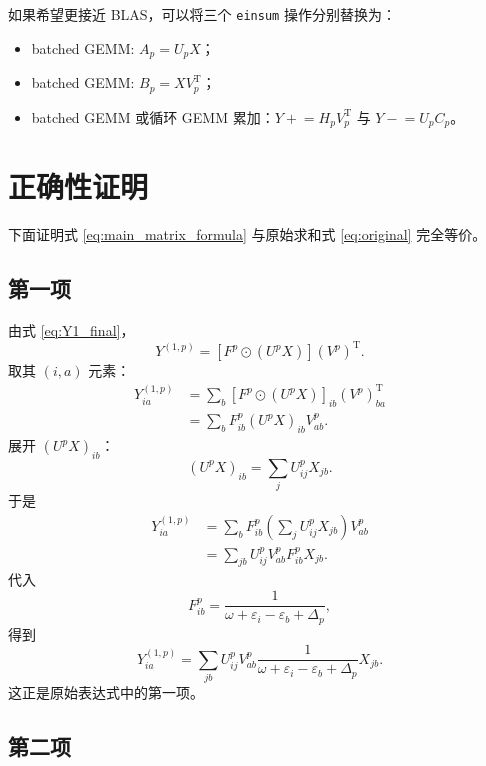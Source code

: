\documentclass[UTF8,a4paper,11pt]{ctexart}
\newcommand{\eps}{\varepsilon}
\newcommand{\Had}{\odot}
\newcommand{\trans}{\mathrm{T}}
\begin{document}
如果希望更接近 BLAS，可以将三个 \texttt{einsum} 操作分别替换为：
\begin{itemize}
  \item batched GEMM: $A_p=U_pX$；
  \item batched GEMM: $B_p=XV_p^{\trans}$；
  \item batched GEMM 或循环 GEMM 累加：$Y\mathrel{+}=H_pV_p^{\trans}$ 与 $Y\mathrel{-}=U_pC_p$。
\end{itemize}

\section{正确性证明}

下面证明式 \eqref{eq:main_matrix_formula} 与原始求和式 \eqref{eq:original} 完全等价。

\subsection{第一项}

由式 \eqref{eq:Y1_final}，
\begin{equation}
Y^{(1,p)}
=
\left[
F^p\Had (U^pX)
\right]
(V^p)^{\trans}.
\end{equation}
取其 $(i,a)$ 元素：
\begin{align}
Y^{(1,p)}_{ia}
&=
\sum_b
\left[
F^p\Had (U^pX)
\right]_{ib}
(V^p)^{\trans}_{ba}
\\
&=
\sum_b
F^p_{ib}
(U^pX)_{ib}
V^p_{ab}.
\end{align}
展开 $(U^pX)_{ib}$：
\begin{equation}
(U^pX)_{ib}
=
\sum_j U^p_{ij}X_{jb}.
\end{equation}
于是
\begin{align}
Y^{(1,p)}_{ia}
&=
\sum_b
F^p_{ib}
\left(
\sum_j U^p_{ij}X_{jb}
\right)
V^p_{ab}
\\
&=
\sum_{jb}
U^p_{ij}V^p_{ab}
F^p_{ib}
X_{jb}.
\end{align}
代入
\begin{equation}
F^p_{ib}
=
\frac{1}{\omega+\eps_i-\eps_b+\Delta_p},
\end{equation}
得到
\begin{equation}
Y^{(1,p)}_{ia}
=
\sum_{jb}
U^p_{ij}V^p_{ab}
\frac{1}{\omega+\eps_i-\eps_b+\Delta_p}
X_{jb}.
\end{equation}
这正是原始表达式中的第一项。

\subsection{第二项}
\end{document}
